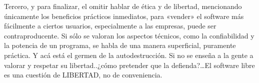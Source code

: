 \documentclass[10pt,a5paper,twoside,,]{book}
\begin{document}
Tercero, y para finalizar, el omitir hablar de ética y de libertad,
mencionando únicamente los beneficios prácticos inmediatos, para
«vender» el software más fácilmente a ciertos usuarios, especialmente a
las empresas, puede ser contraproducente. Si sólo se valoran los
aspectos técnicos, como la confiabilidad y la potencia de un programa,
se habla de una manera superficial, puramente práctica. Y acá está el
germen de la autodestrucción. Si no se enseña a la gente a valorar y
respetar su libertad..¿cómo pretender que la defienda?\ldots{}El
software libre es una cuestión de LIBERTAD, no de conveniencia.
\end{document}
